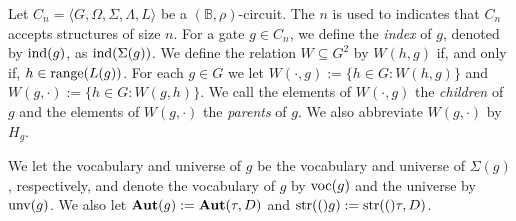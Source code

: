 \documentclass[../paper.tex]{subfiles}
\begin{document}
Let $C_n = \langle G, \Omega, \Sigma, \Lambda, L \rangle$ be a $(\mathbb{B},
\rho)$-circuit. The $n$ is used to indicates that $C_n$ accepts structures of
size $n$. For a gate $g \in C_n$, we define the \emph{index} of $g$, denoted by
$\text{\upshape ind}(g)$, as $\text{\upshape ind}(\Sigma(g))$. We define the relation $W \subseteq G^2$ by
$W(h,g)$ if, and only if, $h \in \text{range}(L(g))$. For each $g \in G$ we let
$W(\cdot, g) := \{h \in G : W(h,g)\}$ and $W(g, \cdot) := \{h \in G : W(g,h)\}$.
We call the elements of $W(\cdot, g)$ the \emph{children} of $g$ and the
elements of $W(g, \cdot)$ the \emph{parents} of $g$. We also abbreviate $W(g,
\cdot)$ by $H_g$.

We let the vocabulary and universe of $g$ be the vocabulary and universe of
$\Sigma(g)$, respectively, and denote the vocabulary of $g$ by $\text{voc}(g)$ and
the universe by $\text{unv}(g)$. We also let $\text{\textbf{Aut}}(g) := \text{\textbf{Aut}}(\tau, D)$ and
$\text{str}(()g) := \text{str}(()\tau, D)$.




\end{document}
